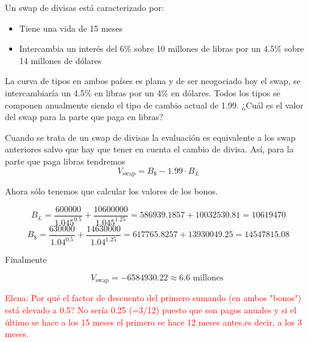 \begin{problem}[4]
Un swap de divisas está caracterizado por:
\begin{itemize}
\item Tiene una vida de 15 meses
\item Intercambia un interés del 6\% sobre 10 millones de libras por un 4.5\% sobre 14 millones de dólares
\end{itemize}

La curva de tipos en ambos países es plana y de ser neogociado hoy el swap, se intercambiaría un 4.5\% en libras por un 4\% en dólares. Todos los tipos se componen anualmente siendo el tipo de cambio actual de 1.99. ¿Cuál es el valor del swap para la parte que paga en libras?

\solution
{}

Cuando se trata de un swap de divisas la evaluación es equivalente a los swap anteriores salvo que hay que tener en cuenta el cambio de divisa. Así, para la
parte que paga libras tendremos
\[V_{\text{swap}}=B_{\$}-1.99\cdot B_{\pounds}\]

Ahora sólo tenemos que calcular los valores de los bonos.

\[B_{\pounds} = \frac{600000}{1.045^{0.5}} + \frac{10600000}{1.045^{1.25}} = 586939.1857 + 10032530.81 = 10619470\]
\[B_{\$} = \frac{630000}{1.04^{0.5}} + \frac{14630000}{1.04^{1.25}} = 617765.8257 +13930049.25 = 14547815.08\]

Finalmente

\[V_{\text{swap}} = -6584930.22 \approx 6.6 \text{ millones }\]

\textcolor{red}{Elena: Por qué el factor de descuento del primero sumando (en ambos "bonos") está elevado a 0.5? No sería 0.25 (=3/12) puesto que son pagos anuales y si el último se hace a los 15 meses el primero se hace 12 meses antes,es decir, a los 3 meses.}
\end{problem}

